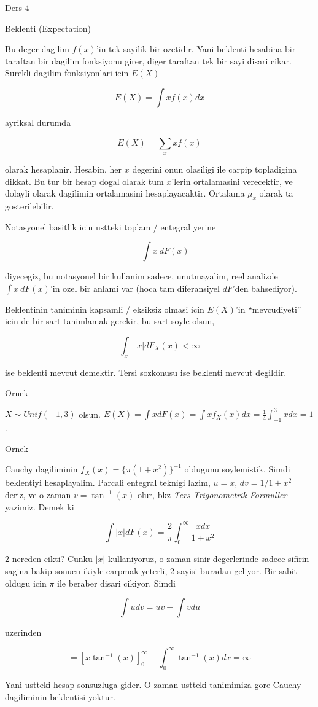 \documentclass[12pt,fleqn]{article}\usepackage{../common}
\begin{document}
Ders 4

Beklenti (Expectation) 

Bu deger dagilim $f(x)$'in tek sayilik bir ozetidir. Yani beklenti hesabina
bir taraftan bir dagilim fonksiyonu girer, diger taraftan tek bir sayi
disari cikar. Surekli dagilim fonksiyonlari icin $E(X)$

\[  E(X) = \int x f(x) dx\]

ayriksal durumda

\[ E(X) = \sum_x xf(x) \]

olarak hesaplanir. Hesabin, her $x$ degerini onun olasiligi ile carpip
topladigina dikkat. Bu tur bir hesap dogal olarak tum $x$'lerin
ortalamasini verecektir, ve dolayli olarak dagilimin ortalamasini
hesaplayacaktir. Ortalama $\mu_x$ olarak ta gosterilebilir.

Notasyonel basitlik icin ustteki toplam / entegral yerine 

\[ = \int x \ dF(x) \]

diyecegiz, bu notasyonel bir kullanim sadece, unutmayalim, reel analizde
$\int x \ dF(x)$'in ozel bir anlami var (hoca tam diferansiyel $dF$'den
bahsediyor). 

Beklentinin taniminin kapsamli / eksiksiz olmasi icin $E(X)$'in
``mevcudiyeti'' icin de bir sart tanimlamak gerekir, bu sart soyle olsun, 

\[ \int_x |x|dF_X(x) < \infty \]

ise beklenti mevcut demektir. Tersi sozkonusu ise beklenti mevcut
degildir. 


Ornek 

$X \sim Unif(-1,3)$ olsun. $E(X) = \int xdF(x) = \int x f_X(x)dx = \frac{
  1}{4} \int _{ -1}^{3} x dx = 1$. 

Ornek 

Cauchy dagiliminin $f_X(x) = \{ \pi (1+x^2) \} ^{-1}$ oldugunu soylemistik. Simdi 
beklentiyi hesaplayalim. Parcali entegral teknigi lazim, $u=x$, 
$dv =
1/1+x^2$ deriz, ve o zaman $v = \tan ^{-1}(x)$ olur, bkz {\em Ters
  Trigonometrik Formuller} yazimiz. Demek ki 

\[ \int |x|dF(x) = \frac{ 2}{\pi} \int _{ 0}^{\infty}\frac{x dx}{1+x^2}  \]

2 nereden cikti? Cunku $|x|$ kullaniyoruz, o zaman sinir degerlerinde
sadece sifirin sagina bakip sonucu ikiyle carpmak yeterli, 2 sayisi buradan
geliyor. Bir sabit oldugu icin $\pi$ ile beraber disari cikiyor. Simdi 

\[ \int udv = uv - \int vdu \]
 
uzerinden

\[ = [x \tan ^{-1}(x) ] _{ 0}^{\infty} - \int _{ 0}^{\infty} \tan ^{-1}(x)
dx  = \infty\]

Yani ustteki hesap sonsuzluga gider. O zaman ustteki tanimimiza gore Cauchy
dagiliminin beklentisi yoktur. 
\end{document}
